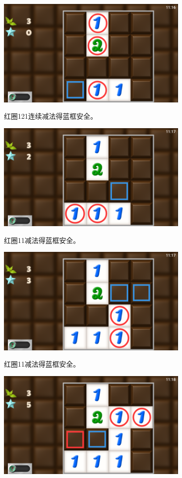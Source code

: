 \subsection{} %
\begin{center}
    \includegraphics[width=0.7\textwidth]{puzzle/21-1.png}
\end{center}
红圈121连续减法得蓝框安全。
\begin{center}
    \includegraphics[width=0.7\textwidth]{puzzle/21-2.png}
\end{center}
红圈11减法得蓝框安全。
\begin{center}
    \includegraphics[width=0.7\textwidth]{puzzle/21-3.png}
\end{center}
红圈11减法得蓝框安全。
\begin{center}
    \includegraphics[width=0.7\textwidth]{puzzle/21-4.png}
\end{center}
